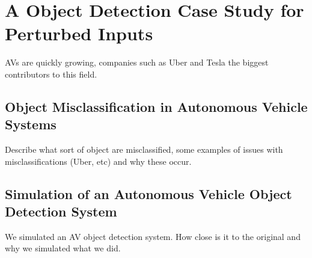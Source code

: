 \section{A Object Detection Case Study for Perturbed Inputs}
\acfp{AV} are quickly growing, companies such as Uber and Tesla the biggest contributors to this field.


\subsection{Object Misclassification in Autonomous Vehicle Systems}
Describe what sort of object are misclassified, some examples of issues with misclassifications (Uber, etc) and why these occur.

\subsection{Simulation of an Autonomous Vehicle Object Detection System}
We simulated an AV object detection system.
How close is it to the original and why we simulated what we did.

